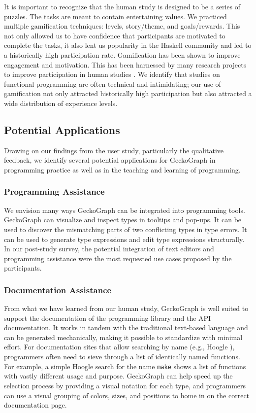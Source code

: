 It is important to recognize that the human study is designed to be a series of puzzles. The tasks are meant to contain entertaining values. We practiced multiple gamification techniques: levels, story/theme, and goals/rewards. \cite{Hamari2014-mc} This not only allowed us to have confidence that participants are motivated to complete the tasks, it also lent us popularity in the Haskell community and led to a historically high participation rate. Gamification has been shown to improve engagement and motivation. This has been harnessed by many research projects to improve participation in human studies \cite{He2014-vp}. We identify that studies on functional programming are often technical and intimidating; our use of gamification not only attracted historically high participation but also attracted a wide distribution of experience levels. 

\subsection{Potential Applications}

Drawing on our findings from the user study, particularly the qualitative feedback, we identify several potential applications for GeckoGraph in programming practice as well as in the teaching and learning of programming.

\subsubsection{Programming Assistance}
We envision many ways GeckoGraph can be integrated into programming tools. GeckoGraph can visualize and inspect types in tooltips and pop-ups. It can be used to discover the mismatching parts of two conflicting types in type errors. It can be used to generate type expressions and edit type expressions structurally. In our post-study survey, the potential integration of text editors and programming assistance were the most requested use cases proposed by the participants. 

\subsubsection{Documentation Assistance}
From what we have learned from our human study, GeckoGraph is well suited to support the documentation of the programming library and the API documentation. It works in tandem with the traditional text-based language and can be generated mechanically, making it possible to standardize with minimal effort. For documentation sites that allow searching by name (e.g., Hoogle \cite{Mitchell_undated-fb}), programmers often need to sieve through a list of identically named functions. For example, a simple Hoogle search for the name \texttt{make} shows a list of functions with vastly different usage and purpose. GeckoGraph can help speed up the selection process by providing a visual notation for each type, and programmers can use a visual grouping of colors, sizes, and positions to home in on the correct documentation page.



